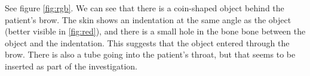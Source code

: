 \documentclass{article}[10pt]
\begin{document}
\begin{enumerate}
See figure \ref{fig:rgb}. We can see that there is a coin-shaped object behind
the patient's brow. The skin shows an indentation at the same angle as the
object (better visible in \ref{fig:red}), and there is a small hole in the bone
bone between the object and the indentation. This suggests that the object
entered through the brow. There is also a tube going into the patient's throat,
but that seems to be inserted as part of the investigation.
\end{enumerate}
\end{document}
